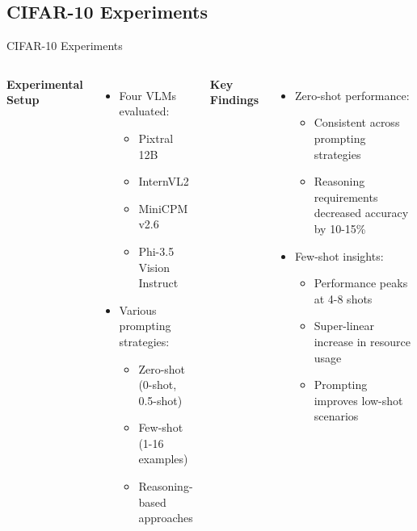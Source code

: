 \documentclass[aspectratio=169]{beamer}
\begin{document}
\subsection{CIFAR-10 Experiments}
\begin{frame}{CIFAR-10 Experiments}
  \begin{columns}[T]
      \textbf{Experimental Setup}
      \begin{itemize}
        \item Four VLMs evaluated:
        \begin{itemize}
          \item Pixtral 12B
          \item InternVL2
          \item MiniCPM v2.6
          \item Phi-3.5 Vision Instruct
        \end{itemize}
        \item Various prompting strategies:
        \begin{itemize}
          \item Zero-shot (0-shot, 0.5-shot)
          \item Few-shot (1-16 examples)
          \item Reasoning-based approaches
        \end{itemize}
      \end{itemize}
      \textbf{Key Findings}
      \begin{itemize}
        \item Zero-shot performance:
        \begin{itemize}
          \item Consistent across prompting strategies
          \item Reasoning requirements decreased accuracy by 10-15\%
        \end{itemize}
        \item Few-shot insights:
        \begin{itemize}
          \item Performance peaks at 4-8 shots
          \item Super-linear increase in resource usage
          \item Prompting improves low-shot scenarios
        \end{itemize}
      \end{itemize}
  \end{columns}
\end{frame}
\end{document}
